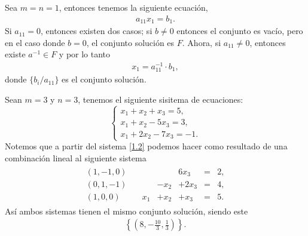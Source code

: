 \documentclass[12pt,a4paper]{book}
\begin{document}
    \vspace{1.1cm}
    
    \begin{ejemplo}
        Sea $m = n = 1$, entonces tenemos la siguiente ecuación,
        \begin{align*}
            a_{11}x_1 = b_1.
        \end{align*}
        Si $a_{11} = 0$, entonces existen dos casos; si $b \neq 0$ entonces el conjunto es vacío, pero en el caso donde $b = 0$, el conjunto solución es $F$. Ahora, si $a_{11} \neq 0$, entonces existe $a^{-1} \in F$ y por lo tanto
        \begin{align*}
            x_1 = a_{11}^{-1} \cdot b_1,
        \end{align*}
        donde $\{b_i / a_{11}\}$ es el conjunto solución.
    \end{ejemplo}
    
    \begin{ejemplo}
        Sean $m = 3$ y $n = 3$, tenemos el siguiente sisitema de ecuaciones:
        \begin{equation}
            \begin{cases}
                x_1+x_2+x_3=5,\\
                x_1+x_2-5x_3=3,\\
                x_1+2x_2-7x_3=-1.
            \end{cases}
            \tag{1.2}
            \label{1.2}
        \end{equation}
        Notemos que a partir del sistema \eqref{1.2} podemos hacer como resultado de una combinación lineal al siguiente sistema
        \begin{align*}
            \begin{alignedat}{4}
                (1,-1,0)\quad &      &      & 6x_3  & ={} & 2,\\
                (0,1,-1)\quad &      & -x_2 & +2x_3 & ={} & 4,\\
                (1,0,0)\quad  & x_1  & +x_2 & +x_3  & ={} & 5.
            \end{alignedat}
        \end{align*}
        Así ambos sistemas tienen el mismo conjunto solución, siendo este
        \begin{align*}
            \left\{\left(8, - \frac{10}{3}, \frac{1}{3} \right) \right\}.
        \end{align*}
    \end{ejemplo}
\end{document}

